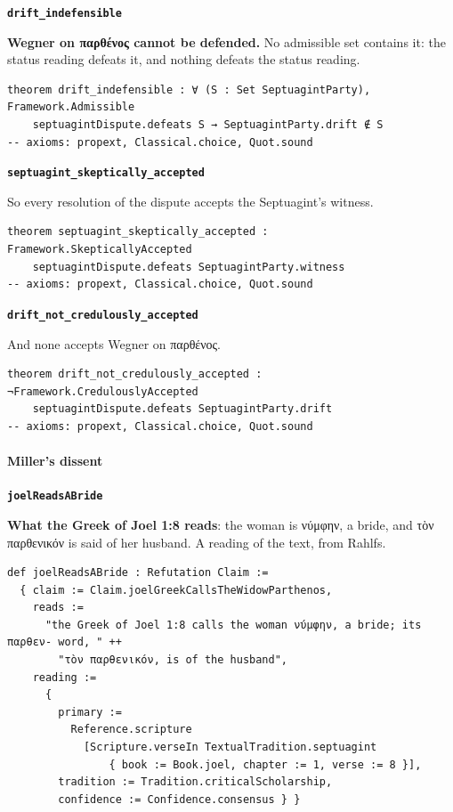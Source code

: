 \documentclass[11pt]{article}
\begin{document}
\par\medskip\noindent\textbf{\texttt{drift\_\allowbreak{}indefensible}}\par\nobreak\noindent
\textbf{Wegner on παρθένος cannot be defended.} No admissible set contains it: the status reading defeats it, and nothing defeats the status reading.

{\small\begin{verbatim}
theorem drift_indefensible : ∀ (S : Set SeptuagintParty), Framework.Admissible
    septuagintDispute.defeats S → SeptuagintParty.drift ∉ S
-- axioms: propext, Classical.choice, Quot.sound
\end{verbatim}}
\par\medskip\noindent\textbf{\texttt{septuagint\_\allowbreak{}skeptically\_\allowbreak{}accepted}}\par\nobreak\noindent
So every resolution of the dispute accepts the Septuagint’s witness.

{\small\begin{verbatim}
theorem septuagint_skeptically_accepted : Framework.SkepticallyAccepted
    septuagintDispute.defeats SeptuagintParty.witness
-- axioms: propext, Classical.choice, Quot.sound
\end{verbatim}}
\par\medskip\noindent\textbf{\texttt{drift\_\allowbreak{}not\_\allowbreak{}credulously\_\allowbreak{}accepted}}\par\nobreak\noindent
And none accepts Wegner on παρθένος.

{\small\begin{verbatim}
theorem drift_not_credulously_accepted : ¬Framework.CredulouslyAccepted
    septuagintDispute.defeats SeptuagintParty.drift
-- axioms: propext, Classical.choice, Quot.sound
\end{verbatim}}
\paragraph*{Miller’s dissent}
\leavevmode\par\nobreak
\par\medskip\noindent\textbf{\texttt{joel\allowbreak{}Reads\allowbreak{}ABride}}\par\nobreak\noindent
\textbf{What the Greek of Joel 1:8 reads}: the woman is νύμφην, a bride, and τὸν παρθενικόν is said of her husband. A reading of the text, from Rahlfs.

{\small\begin{verbatim}
def joelReadsABride : Refutation Claim :=
  { claim := Claim.joelGreekCallsTheWidowParthenos,
    reads :=
      "the Greek of Joel 1:8 calls the woman νύμφην, a bride; its παρθεν- word, " ++
        "τὸν παρθενικόν, is of the husband",
    reading :=
      {
        primary :=
          Reference.scripture
            [Scripture.verseIn TextualTradition.septuagint
                { book := Book.joel, chapter := 1, verse := 8 }],
        tradition := Tradition.criticalScholarship,
        confidence := Confidence.consensus } }
\end{verbatim}}
\end{document}
